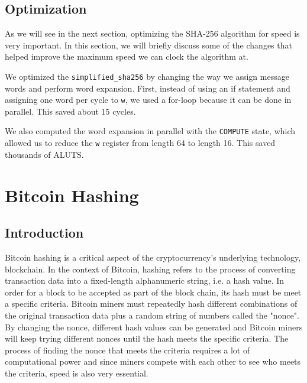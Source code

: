 \documentclass{article}
\begin{document}
\subsection{Optimization}

As we will see in the next section, optimizing the SHA-256 algorithm for speed is very important. In this section, we will briefly discuss some of the changes that helped improve the maximum speed we can clock the algorithm at.

We optimized the \verb|simplified_sha256| by changing the way we assign message words and perform word expansion. First, instead of using an if statement and assigning one word per cycle to \verb|w|, we used a for-loop because it can be done in parallel. This saved about 15 cycles.


We also computed the word expansion in parallel with the \verb|COMPUTE| state, which allowed us to reduce the \verb|w| register from length 64 to length 16. This saved thousands of ALUTS.






\newpage
\section{Bitcoin Hashing}

\subsection{Introduction}


Bitcoin hashing is a critical aspect of the cryptocurrency's underlying technology, blockchain. In the context of Bitcoin, hashing refers to the process of converting transaction data into a fixed-length alphanumeric string, i.e. a hash value. In order for a block to be accepted as part of the block chain, its hash must be meet a specific criteria. Bitcoin miners must repeatedly hash different combinations of the original transaction data plus a random string of numbers called the "nonce". By changing the nonce, different hash values can be generated and Bitcoin miners will keep trying different nonces until the hash meets the specific criteria. The process of finding the nonce that meets the criteria requires a lot of computational power and since miners compete with each other to see who meets the criteria, speed is also very essential.
\end{document}
